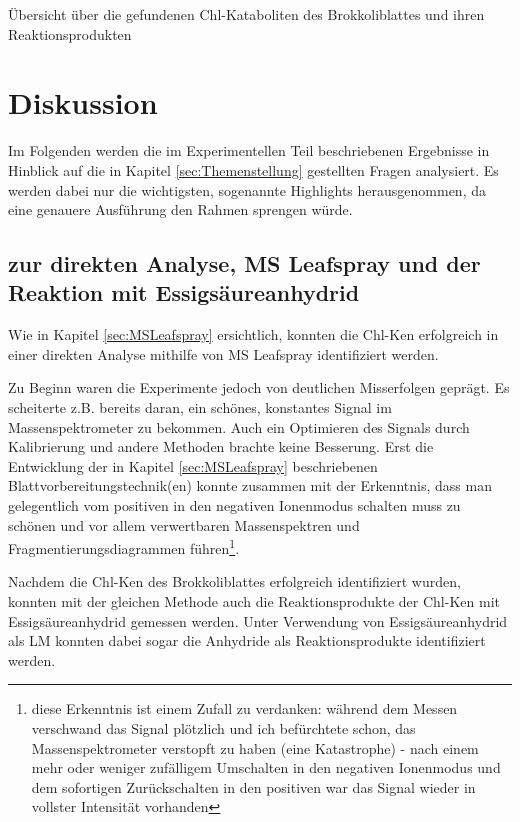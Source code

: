 \begin{sidewaystable*}[!htbp]
  \caption[Übersicht über die Chl-Kataboliten des Brokkoliblattes unter Berücksichtigun der Erkenntnisse aller Methoden, Quelle: Autor]{Übersicht über die gefundenen Chl-Kataboliten des Brokkoliblattes und ihren Reaktionsprodukten}
  \label{tab:LCMSKatabolitenRPListe}
\end{sidewaystable*}

\chapter{Diskussion}

Im Folgenden werden die im Experimentellen Teil beschriebenen Ergebnisse in Hinblick auf die in Kapitel \ref{sec:Themenstellung} gestellten Fragen analysiert. Es werden dabei nur die wichtigsten, sogenannte Highlights herausgenommen, da eine genauere Ausführung den Rahmen sprengen würde.

\section{zur direkten Analyse, MS Leafspray und der Reaktion mit Essigsäureanhydrid}

Wie in Kapitel \ref{sec:MSLeafspray} ersichtlich, konnten die \gls{Chl-K}en erfolgreich in einer direkten Analyse mithilfe von MS Leafspray identifiziert werden.  

Zu Beginn waren die Experimente jedoch von deutlichen Misserfolgen geprägt. Es scheiterte z.B. bereits daran, ein schönes, konstantes Signal im Massenspektrometer zu bekommen. Auch ein Optimieren des Signals durch Kalibrierung und andere Methoden brachte keine Besserung. Erst die Entwicklung der in Kapitel \ref{sec:MSLeafspray} beschriebenen Blattvorbereitungstechnik(en) konnte zusammen mit der Erkenntnis, dass man gelegentlich vom positiven in den negativen Ionenmodus schalten muss zu schönen und vor allem verwertbaren Massenspektren und Fragmentierungsdiagrammen führen\footnote{diese Erkenntnis ist einem Zufall zu verdanken: während dem Messen verschwand das Signal plötzlich und ich befürchtete schon, das Massenspektrometer verstopft zu haben (eine Katastrophe) - nach einem mehr oder weniger zufälligem Umschalten in den negativen Ionenmodus und dem sofortigen Zurückschalten in den positiven war das Signal wieder in vollster Intensität vorhanden}. 

Nachdem die \gls{Chl-K}en des Brokkoliblattes erfolgreich identifiziert wurden, konnten mit der gleichen Methode auch die Reaktionsprodukte der \gls{Chl-K}en mit Essigsäureanhydrid gemessen werden. Unter Verwendung von Essigsäureanhydrid als LM konnten dabei sogar die Anhydride als Reaktionsprodukte identifiziert werden.

